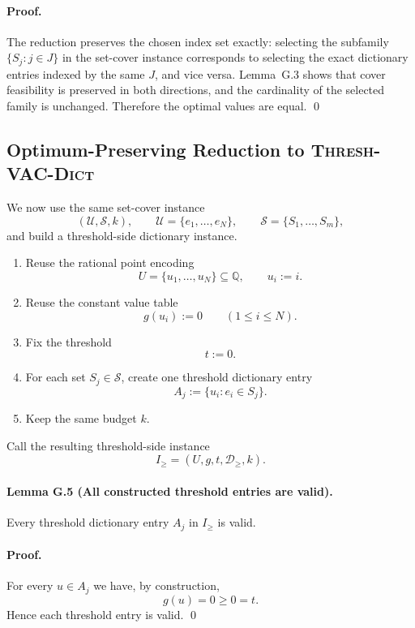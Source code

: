 \paragraph{Proof.}
The reduction preserves the chosen index set exactly: selecting the subfamily $\{S_j:j\in J\}$ in the set-cover instance corresponds to selecting the exact dictionary entries indexed by the same $J$, and vice versa. Lemma~G.3 shows that cover feasibility is preserved in both directions, and the cardinality of the selected family is unchanged. Therefore the optimal values are equal. \qed

\subsection{Optimum-Preserving Reduction to \textsc{Thresh-VAC-Dict}}

We now use the same set-cover instance
\[
(\mathcal U,\mathcal S,k),
\qquad
\mathcal U=\{e_1,\dots,e_N\},
\qquad
\mathcal S=\{S_1,\dots,S_m\},
\]
and build a threshold-side dictionary instance.
\begin{enumerate}
    \item Reuse the rational point encoding
    \[
    U=\{u_1,\dots,u_N\}\subseteq\mathbb Q,
    \qquad
    u_i:=i.
    \]
    \item Reuse the constant value table
    \[
    g(u_i):=0
    \qquad (1\le i\le N).
    \]
    \item Fix the threshold
    \[
    t:=0.
    \]
    \item For each set $S_j\in\mathcal S$, create one threshold dictionary entry
    \[
    A_j:=\{u_i: e_i\in S_j\}.
    \]
    \item Keep the same budget $k$.
\end{enumerate}
Call the resulting threshold-side instance
\[
I_{\ge}=(U,g,t,\mathcal D_{\ge},k).
\]

\paragraph{Lemma G.5 (All constructed threshold entries are valid).}
Every threshold dictionary entry $A_j$ in $I_{\ge}$ is valid.

\paragraph{Proof.}
For every $u\in A_j$ we have, by construction,
\[
g(u)=0\ge 0=t.
\]
Hence each threshold entry is valid. \qed

